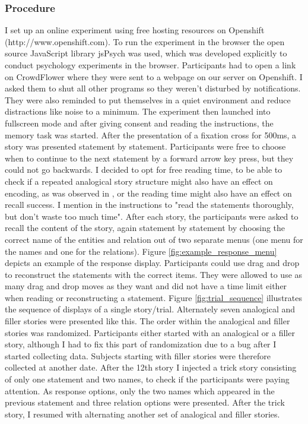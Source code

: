 \documentclass[a4paper,man,natbib,floatsintext,import]{apa6}
\begin{document}
\subsubsection{Procedure}
I set up an online experiment using free hosting resources on Openshift (http://www.openshift.com). To run the experiment in the browser the open source JavaScript library jsPsych \citep{DeLeeuw2015} was used, which was developed explicitly to conduct psychology experiments in the browser. Participants had to open a link on CrowdFlower where they were sent to a webpage on our server on Openshift. I asked them to shut all other programs so they weren't disturbed by notifications. They were also reminded to put themselves in a quiet environment and reduce distractions like noise to a minimum. The experiment then launched into fullscreen mode and after giving consent and reading the instructions, the memory task was started.
After the presentation of a fixation cross for 500ms, a story was presented statement by statement. Participants were free to choose when to continue to the next statement by a forward arrow key press, but they could not go backwards. I decided to opt for free reading time, to be able to check if a repeated analogical story structure might also have an effect on encoding, as was observed in \cite{Day2007}, or the reading time might also have an effect on recall success. I mention in the instructions to "read the statements thoroughly, but don't waste too much time". After each story, the participants were asked to recall the content of the story, again statement by statement by choosing the correct name of the entities and relation out of two separate menus (one menu for the names and one for the relations). Figure \ref{fig:example_response_menu} depicts an example of the response display. Participants could use drag and drop to reconstruct the statements with the correct items. They were allowed to use as many drag and drop moves as they want and did not have a time limit either when reading or reconstructing a statement. Figure \ref{fig:trial_sequence} illustrates the sequence of displays of a single story/trial.
Alternately seven analogical and filler stories were presented like this. The order within the analogical and filler stories was randomized. Participants either started with an analogical or a filler story, although I had to fix this part of randomization due to a bug after I started collecting data. Subjects starting with filler stories were therefore collected at another date. After the 12th story I injected a trick story consisting of only one statement and two names, to check if the participants were paying attention. As response options, only the two names which appeared in the previous statement and three relation options were presented. After the trick story, I resumed with alternating another set of analogical and filler stories.
\end{document}
